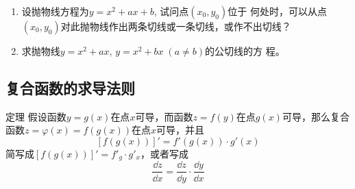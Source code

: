 \begin{ex}
\begin{enumerate}
\item 设抛物线方程为$y=x^2+ax+b$, 试问点$(x_0,y_0)$位于
何处时，可以从点$(x_0,y_0)$对此抛物线作出两条切线或一条切线，或作不出切线？
\item 求抛物线$y=x^2+ax$, $y=x^2+bx\; (a\ne b)$的公切线的方
程。
\end{enumerate} 
\end{ex}

\subsection{复合函数的求导法则}
\begin{blk}
    {定理} 假设函数$y=g(x)$在点$x$可导，而函数$z=f(y)$在点$g(x)$可导，那么复合函数$z=\varphi(x)=f(g(x))$在点$x$可导，并且
\[[f(g(x))]'=f'(g(x))\cdot g'(x)\]
简写成$[f(g(x))]'=f'_g\cdot g'_x$，或者写成
\[\frac{\dd z}{\dd x}=\frac{\dd z}{\dd y}\cdot \frac{\dd y}{\dd x}\]
\end{blk}

